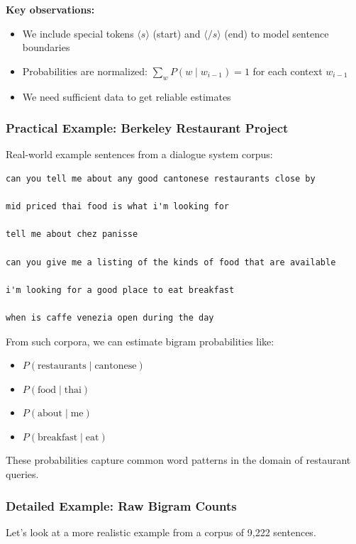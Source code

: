 \documentclass[11pt,a4paper]{article}
\theoremstyle{definition}
\theoremstyle{plain}
\theoremstyle{remark}
\begin{document}
\textbf{Key observations:}
\begin{itemize}
    \item We include special tokens $\langle s \rangle$ (start) and $\langle /s \rangle$ (end) to model sentence boundaries
    \item Probabilities are normalized: $\sum_{w} P(w \mid w_{i-1}) = 1$ for each context $w_{i-1}$
    \item We need sufficient data to get reliable estimates
\end{itemize}

\subsubsection{Practical Example: Berkeley Restaurant Project}

Real-world example sentences from a dialogue system corpus:

\begin{verbatim}
can you tell me about any good cantonese restaurants close by

mid priced thai food is what i'm looking for

tell me about chez panisse

can you give me a listing of the kinds of food that are available

i'm looking for a good place to eat breakfast

when is caffe venezia open during the day
\end{verbatim}

From such corpora, we can estimate bigram probabilities like:
\begin{itemize}
    \item $P(\text{restaurants} \mid \text{cantonese})$
    \item $P(\text{food} \mid \text{thai})$
    \item $P(\text{about} \mid \text{me})$
    \item $P(\text{breakfast} \mid \text{eat})$
\end{itemize}

These probabilities capture common word patterns in the domain of restaurant queries.

\subsubsection{Detailed Example: Raw Bigram Counts}

Let's look at a more realistic example from a corpus of 9,222 sentences.
\end{document}
